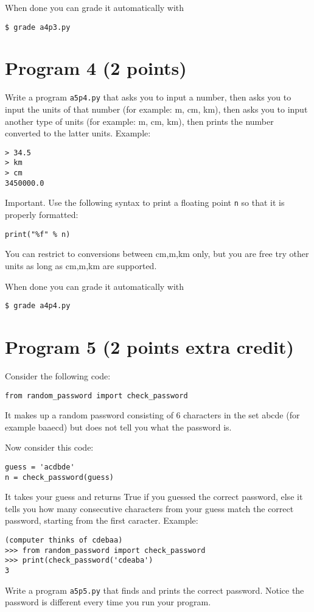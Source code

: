 \documentclass[12pt]{article}
\begin{document}
\noindent When done you can grade it automatically with
\begin{verbatim}
$ grade a4p3.py
\end{verbatim}

\section{Program 4 (2 points)}

\noindent
Write a program {\tt a5p4.py} that asks you to input a number, then asks you to input the units of that number (for example: m, cm, km), then asks you to input another type of units (for example: m, cm, km), then prints the number converted to the latter units. Example:
\begin{verbatim}
> 34.5
> km
> cm
3450000.0
\end{verbatim}
\noindent Important. Use the following syntax to print a floating point {\tt n} so that it is properly formatted:
\begin{verbatim}
print("%f" % n)
\end{verbatim}
\noindent You can restrict to conversions between cm,m,km only, but you are free try other units as long as cm,m,km are supported.

\noindent When done you can grade it automatically with
\begin{verbatim}
$ grade a4p4.py
\end{verbatim}

\section{Program 5 (2 points extra credit)}

Consider the following code:
\begin{verbatim}
from random_password import check_password
\end{verbatim}
It makes up a random password consisting of 6 characters in the set abcde (for example baaecd) but does not tell you what the password is.

Now consider this code:
\begin{verbatim}
guess = 'acdbde'
n = check_password(guess)
\end{verbatim}
It takes your guess and returns True if you guessed the correct password, else it tells you how many consecutive characters from your guess match the correct password, starting from the first caracter. Example:
\begin{verbatim}
(computer thinks of cdebaa)
>>> from random_password import check_password
>>> print(check_password('cdeaba')
3
\end{verbatim}

Write a program {\tt a5p5.py} that finds and prints the correct password. Notice the password is different every time you run your program.
\end{document}
